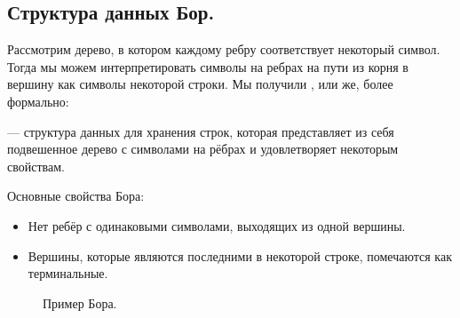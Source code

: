\subsection{Структура данных Бор.}
Рассмотрим дерево, в котором каждому ребру соответствует некоторый символ.
Тогда мы можем интерпретировать символы на ребрах на пути из корня в вершину как символы некоторой строки.
Мы получили , или же, более формально:

\begin{definition}
         --- структура данных для хранения строк, которая представляет из себя 
        подвешенное дерево с символами на рёбрах и удовлетворяет некоторым свойствам.
\end{definition}

Основные свойства Бора:
\begin{itemize}
        \item Нет ребёр с одинаковыми символами, выходящих из одной вершины.
        \item Вершины, которые являются последними в некоторой строке, помечаются как терминальные. 
\end{itemize}

\begin{figure}[htbp]
        \caption*{Пример Бора.}
        \begin{center}
        \end{center}
\end{figure}

